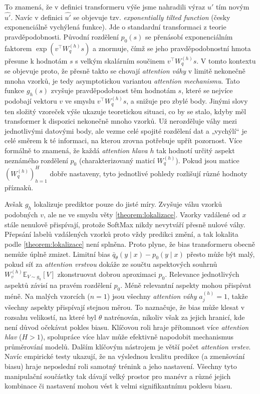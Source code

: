 To znamená, že v definici transformeru výše jsme nahradili výraz $u'$ tím novým $\hat{u'}$.
Navíc v definici $\hat{u'}$ se objevuje tzv. \emph{exponentially tilted function} (česky exponenciálně vychýlená funkce).
Jde o standardní transformaci z teorie pravděpodobnosti.
Původní rozdělení $p_0(s)$ se přenásobí exponenciálním faktorem $\exp(v^\top W^{(h)}_q s)$ a znormuje, čímž se jeho pravděpodobnostní hmota přesune k hodnotám $s$ s velkým skalárním součinem $v^\top W^{(h)}_q s$.
V tomto kontextu se objevuje proto, že přesně takto se chovají \emph{attention váhy} v limitě nekonečně mnoha vzorků, je tedy asymptotickou variantou \emph{attention mechanismu}.
Tato funkce $g_h(s)$ zvyšuje pravděpodobnost těm hodnotám $s$, které se nejvíce podobají vektoru $v$ ve smyslu $v^\top W^{(h)}_q s$, a snižuje pro zbylé body.
Jinými slovy ten složitý vzoreček výše ukazuje teoretickou situaci, co by se stalo, kdyby měl transformer k dispozici nekonečně mnoho vzorků. 
Už nerozděluje váhy mezi jednotlivými datovými body, ale vezme celé spojité rozdělení dat a „vychýlí“ je celé směrem k té informaci, na kterou zrovna potřebuje upřít pozornost.
Více formálně to znamená, že každá \emph{attention hlava} $h$ tak hodnotí určitý aspekt neznámého rozdělení $p_0$ (charakterizovaný maticí $W^{(h)}_q$). 
Pokud jsou matice $(W^{(h)}_q)_{h=1}^H$ dobře nastaveny, tyto jednotlivé pohledy rozlišují různé hodnoty příznaků.
\par   

Avšak $g_h$ lokalizuje prediktor pouze do jisté míry.
Zvyšuje váhu vzorků podobných $v$, ale ne ve smyslu věty \ref{theorem:lokalizace}.
Vzorky vzdálené od $x$ stále nenulově přispívají, protože SoftMax nikdy nevytváří přesně nulové váhy. 
Přepsání labelů vzdálených vzorků proto vždy predikci změní, a tak lokalita podle \ref{theorem:lokalizace} není splněna.
Proto plyne, že bias transformeru obecně nemůže úplně zmizet.
Limitní bias $\bar{q}_\theta(y \mid x) - p_0(y \mid x)$ přesto může být malý, pokud síť za \emph{attention vrstvou} dokáže ze součtu aspektových souhrnů $W^{(h)}_v \mathbb{E}_{V \sim g_h}[V]$ zkonstruovat dobrou aproximaci $p_0$. 
Relevance jednotlivých aspektů závisí na pravém rozdělení $p_0$.
Méně relevantní aspekty mohou přispívat méně. 
Na malých vzorcích ($n = 1$) jsou všechny \emph{attention váhy} $a^{(h)}_j = 1$, takže všechny aspekty přispívají stejnou měrou. 
To naznačuje, že bias může klesat v rozsahu velikostí, na které byl $\theta$ natrénován, nikoliv však za jejich hranicí, kde není důvod očekávat pokles biasu.
Klíčovou roli hraje přítomnost více \emph{attention hlav} ($H > 1$), spolupráce více hlav může efektivně napodobit mechanismus průměrování modelů.
Dalším klíčovým nástrojem je větší počet \emph{attention vrstev}.
Navíc empirické testy ukazují, že na výslednou kvalitu predikce (a zmenšování biasu) hraje neposlední roli samotný trénink a jeho nastavení.
Všechny tyto manipulační součástky tak dávají velký prostor pro manévr a různé jejich kombinace či nastavení mohou vést k velmi signifikantnímu poklesu biasu.
\par

